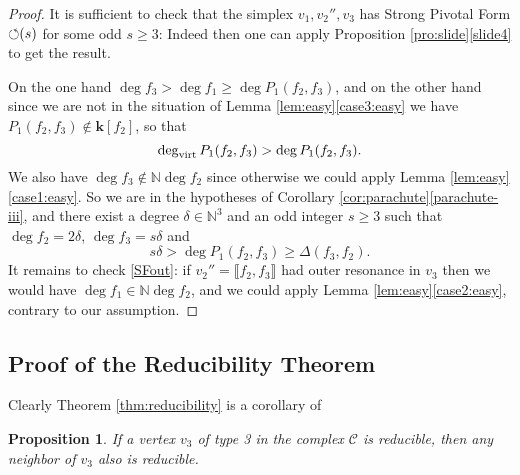 \documentclass[reqno,oneside,11pt]{amsart}
\theoremstyle{plain}
\newtheorem{proposition}[theorem]{Proposition}
\theoremstyle{definition}
\newcommand{\N}{\mathbb{N}}
\newcommand{\K}{\mathbf{k}}
\newcommand{\PF}{\text{$\circlearrowleft$\!\,}}
\newcommand{\Comp}{\mathcal{C}}
\newcommand{\dvirt}{\deg_{\text{\rm virt}}}
\newcommand{\llb}{\llbracket}
\newcommand{\rrb}{\rrbracket}
\renewcommand{\ge}{\geqslant}
\begin{document}
\begin{proof}
It is sufficient to check that the simplex $v_1, v_2'', v_3$ has Strong Pivotal
Form $\PF(s)$ for some odd $s\ge 3$: Indeed then one can apply Proposition
\ref{pro:slide}\ref{slide4} to get the result.

On the one hand $\deg f_3 > \deg f_1 \ge \deg P_1(f_2,f_3)$, and on the other hand since we are not in the situation of Lemma \ref{lem:easy}\ref{case3:easy} we have $P_1(f_2,f_3) \not\in \K[f_2]$, so that
$$\dvirt P_1(f_2,f_3) > \deg P_1(f_2,f_3).$$
We also have $\deg f_3 \not\in \N \deg f_2$ since otherwise we could apply Lemma \ref{lem:easy}\ref{case1:easy}.
So we are in the hypotheses of Corollary \ref{cor:parachute}\ref{parachute-iii}, and there exist a degree $\delta \in \N^3$ and an odd integer $s \ge 3$ such that $\deg f_2 = 2\delta$, $\deg f_3 = s\delta$ and
$$s\delta > \deg P_1(f_2,f_3) \ge \Delta(f_3,f_2).$$
It remains to check \ref{SFout}: if $v_2'' =\llb f_2, f_3\rrb$ had outer resonance in $v_3$ then we would have $\deg f_1 \in \N \deg f_2$, and we could apply Lemma \ref{lem:easy}\ref{case2:easy}, contrary to our assumption.
\end{proof}

\subsection{Proof of the Reducibility Theorem} \label{sec:the proof}

Clearly Theorem \ref{thm:reducibility} is a corollary of

\begin{proposition} \label{pro:reduction path}
If a vertex $v_3$ of type 3 in the complex $\Comp$ is reducible, then any neighbor of $v_3$ also is reducible.
\end{proposition}
\end{document}
